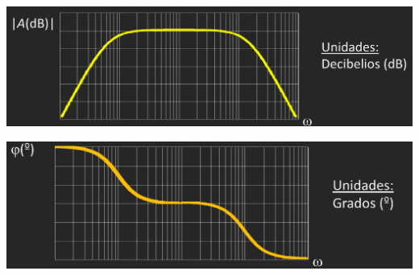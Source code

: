 \documentclass{article}
\begin{document}
\begin{minipage}{0.49\textwidth}
    \centering
    \includegraphics[width=\textwidth]{figbode1.jpg} 
\end{minipage}
\begin{minipage}{0.49\textwidth}
    \centering
    \includegraphics[width=\textwidth]{figbode2.jpg} 
\end{minipage}
\end{document}
